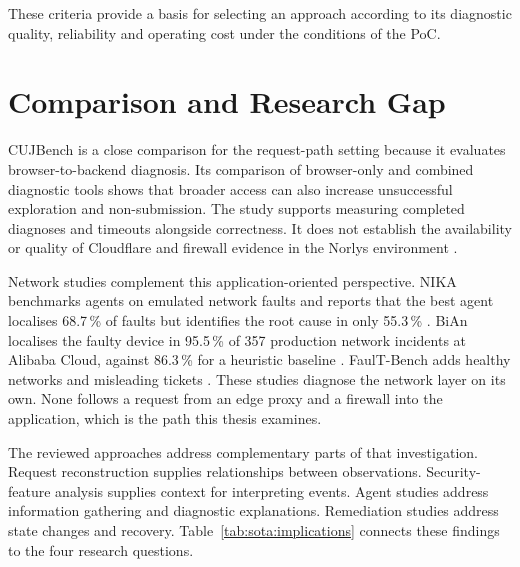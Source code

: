 These criteria provide a basis for selecting an approach according to its
diagnostic quality, reliability and operating cost under the conditions
of the PoC.

\section{Comparison and Research Gap}
\label{sec:state-of-the-art:gap}

CUJBench is a close comparison for the request-path setting because it
evaluates browser-to-backend diagnosis. Its comparison of browser-only and
combined diagnostic tools shows that broader access can also increase
unsuccessful exploration and non-submission. The study supports measuring
completed diagnoses and timeouts alongside correctness. It does not
establish the availability or quality of Cloudflare and firewall evidence
in the Norlys environment \parencite[Section~III]{meng2026cujbench}.

Network studies complement this application-oriented perspective. NIKA
benchmarks agents on emulated network faults and reports that the best
agent localises 68.7\,\% of faults but identifies the root cause in only
55.3\,\% \parencite[Table~2]{wang2025nika}. BiAn localises the faulty
device in 95.5\,\% of 357 production network incidents at Alibaba Cloud,
against 86.3\,\% for a heuristic baseline
\parencite[Section~6.1]{wang2025bian}. FaulT-Bench adds healthy networks
and misleading tickets \parencite{tseng2026faultbench}. These studies
diagnose the network layer on its own. None follows a request from an
edge proxy and a firewall into the application, which is the path this
thesis examines.

The reviewed approaches address complementary parts of that investigation.
Request reconstruction supplies relationships between observations.
Security-feature analysis supplies context for interpreting events.
Agent studies address information gathering
and diagnostic explanations. Remediation studies address state changes and
recovery. Table~\ref{tab:sota:implications} connects these findings to the
four research questions.

